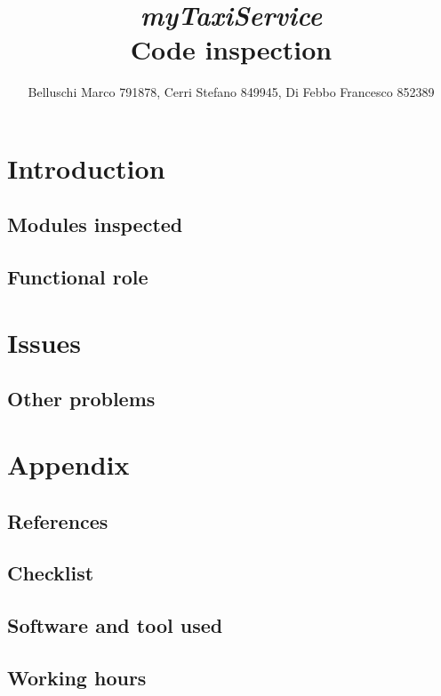 \documentclass[]{report}
\title{{\Huge\textit{myTaxiService}}\\{\Large Code inspection}}
\author{Belluschi Marco 791878, Cerri Stefano 849945, Di Febbo Francesco 852389}
\begin{document}
\maketitle
\tableofcontents

\chapter{Introduction}

\section{Modules inspected}


\section{Functional role}


\chapter{Issues}




\section{Other problems}




\appendix

\chapter{Appendix}

\section{References}


\section{Checklist}


\section{Software and tool used}


\section{Working hours}

\end{document}
